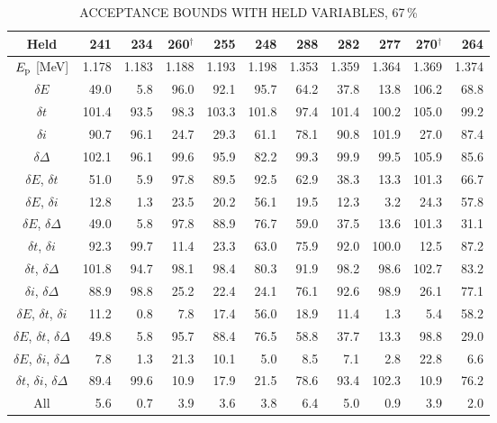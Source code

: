 \begin{table}
\small
    \begin{center}
        \caption{ACCEPTANCE BOUNDS WITH HELD VARIABLES, 67\,\%}
        \label{tab:acceptance-uncertainty-67}
        \begin{tabular}{crrrrrrrrrr}
            \toprule
            \midrule
            \textbf{Held}
                & \textbf{241} & \textbf{234} & \textbf{260}$^\dagger$ & \textbf{255} & \textbf{248}
                & \textbf{288} & \textbf{282} & \textbf{277} & \textbf{270}$^\dagger$ & \textbf{264} \\
            \midrule
$E_{\rm p}$ [MeV] & 1.178 & 1.183 & 1.188 & 1.193 & 1.198 & 1.353 & 1.359 & 1.364 & 1.369 & 1.374 \\
\midrule
$\delta E$     &  49.0 &   5.8 &  96.0 &  92.1 &  95.7 &  64.2 &  37.8 &  13.8 & 106.2 &  68.8 \\
$\delta t$     & 101.4 &  93.5 &  98.3 & 103.3 & 101.8 &  97.4 & 101.4 & 100.2 & 105.0 &  99.2 \\
$\delta i$     &  90.7 &  96.1 &  24.7 &  29.3 &  61.1 &  78.1 &  90.8 & 101.9 &  27.0 &  87.4 \\
$\delta\Delta$ & 102.1 &  96.1 &  99.6 &  95.9 &  82.2 &  99.3 &  99.9 &  99.5 & 105.9 &  85.6 \\
$\delta E$, $\delta t$     &  51.0 &   5.9 &  97.8 &  89.5 &  92.5 &  62.9 &  38.3 &  13.3 & 101.3 &  66.7 \\
$\delta E$, $\delta i$     &  12.8 &   1.3 &  23.5 &  20.2 &  56.1 &  19.5 &  12.3 &   3.2 &  24.3 &  57.8 \\
$\delta E$, $\delta\Delta$ &  49.0 &   5.8 &  97.8 &  88.9 &  76.7 &  59.0 &  37.5 &  13.6 & 101.3 &  31.1 \\
$\delta t$, $\delta i$     &  92.3 &  99.7 &  11.4 &  23.3 &  63.0 &  75.9 &  92.0 & 100.0 &  12.5 &  87.2 \\
$\delta t$, $\delta\Delta$ & 101.8 &  94.7 &  98.1 &  98.4 &  80.3 &  91.9 &  98.2 &  98.6 & 102.7 &  83.2 \\
$\delta i$, $\delta\Delta$ &  88.9 &  98.8 &  25.2 &  22.4 &  24.1 &  76.1 &  92.6 &  98.9 &  26.1 &  77.1 \\
$\delta E$, $\delta t$, $\delta i$     &  11.2 &   0.8 &   7.8 &  17.4 &  56.0 &  18.9 &  11.4 &   1.3 &   5.4 &  58.2 \\
$\delta E$, $\delta t$, $\delta\Delta$ &  49.8 &   5.8 &  95.7 &  88.4 &  76.5 &  58.8 &  37.7 &  13.3 &  98.8 &  29.0 \\
$\delta E$, $\delta i$, $\delta\Delta$ &   7.8 &   1.3 &  21.3 &  10.1 &   5.0 &   8.5 &   7.1 &   2.8 &  22.8 &   6.6 \\
$\delta t$, $\delta i$, $\delta\Delta$ &  89.4 &  99.6 &  10.9 &  17.9 &  21.5 &  78.6 &  93.4 & 102.3 &  10.9 &  76.2 \\
All &   5.6 &   0.7 &   3.9 &   3.6 &   3.8 &   6.4 &   5.0 &   0.9 &   3.9 &   2.0 \\
            \bottomrule
        \end{tabular}


\end{center}
\end{table}
